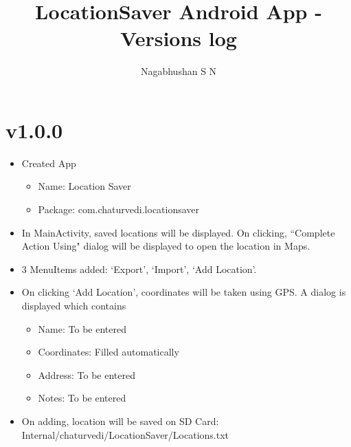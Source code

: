 \documentclass{article}
\title{LocationSaver Android App - Versions log}
\author{Nagabhushan S N}
\begin{document}
\maketitle
\tableofcontents
\newpage

\section{v1.0.0}
\begin{itemize}
\item Created App
  \begin{itemize}
  \item Name: Location Saver
  \item Package: com.chaturvedi.locationsaver
  \end{itemize}
\item In MainActivity, saved locations will be displayed. On clicking, ``Complete Action Using" dialog will be displayed to open the location in Maps.
\item 3 MenuItems added: `Export', `Import', `Add Location'.
\item On clicking `Add Location', coordinates will be taken using GPS. A dialog is displayed which contains 
  \begin{itemize}
  \item Name: To be entered
  \item Coordinates: Filled automatically
  \item Address: To be entered
  \item Notes: To be entered
  \end{itemize}
\item On adding, location will be saved on SD Card: Internal/chaturvedi/LocationSaver/Locations.txt

\end{itemize}
\end{document}
